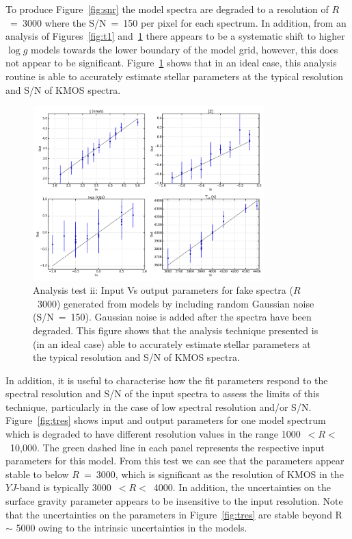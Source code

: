 To produce Figure~\ref{fig:snr} the model spectra are degraded to a resolution of $R$~=~3000 where the S/N~=~150 per pixel for each spectrum.
In addition, from an analysis of Figures~\ref{fig:t1} and~\ref{fig:t2} there appears to be a systematic shift to higher $\log g$ models towards the lower boundary of the model grid, however, this does not appear to be significant.
Figure~\ref{fig:t2} shows that in an ideal case, this analysis routine is able to accurately estimate stellar parameters at the typical resolution and S/N of KMOS spectra.


\begin{figure}
 \centering
 \includegraphics[width=0.80\textwidth]{JAnal/Fakespec-t2-v2}
 \caption[Analysis test ii: Input against output parameters using fake RSG spectra at S/N~=~150 ($R$~=~3000)]{
 Analysis test ii: Input Vs output parameters for fake spectra ($R$~3000) generated from models by including random Gaussian noise (S/N~=~150).
Gaussian noise is added after the spectra have been degraded.
This figure shows that the analysis technique presented is (in an ideal case) able to accurately estimate stellar parameters at the typical resolution and S/N of KMOS spectra.
\label{fig:t2}
         }
\end{figure}

In addition, it is useful to characterise how the fit parameters respond to the spectral resolution and S/N of the input spectra to assess the limits of this technique, particularly in the case of low spectral resolution and/or S/N.
Figure~\ref{fig:tres} shows input and output parameters for one model spectrum which is degraded to have different resolution values in the range 1000~$< R <$~10,000.
The green dashed line in each panel represents the respective input parameters for this model.
From this test we can see that the parameters appear stable to below $R$~=~3000, which is significant as the resolution of KMOS in the $YJ$-band is typically 3000~$< R <$~4000.
In addition, the uncertainties on the surface gravity parameter appears to be insensitive to the input resolution.
Note that the uncertainties on the parameters in Figure~\ref{fig:tres} are stable beyond R $\sim$ 5000 owing to the intrinsic uncertainties in the models.

